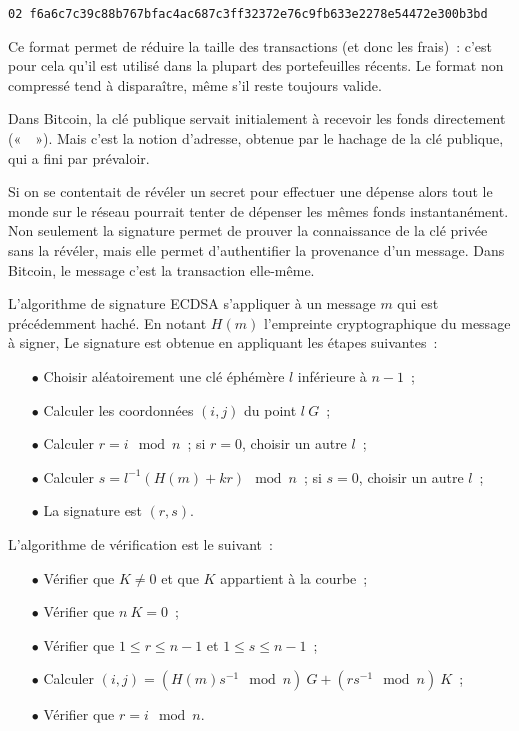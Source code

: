 \begin{Verbatim}[fontsize=\footnotesize]
02 f6a6c7c39c88b767bfac4ac687c3ff32372e76c9fb633e2278e54472e300b3bd
\end{Verbatim}

Ce format permet de réduire la taille des transactions (et donc les frais)~: c'est pour cela qu'il est utilisé dans la plupart des portefeuilles récents. Le format non compressé tend à disparaître, même s'il reste toujours valide.

Dans Bitcoin, la clé publique servait initialement à recevoir les fonds directement («~~»). Mais c'est la notion d'adresse, obtenue par le hachage de la clé publique, qui a fini par prévaloir.


Si on se contentait de révéler un secret pour effectuer une dépense alors tout le monde sur le réseau pourrait tenter de dépenser les mêmes fonds instantanément. Non seulement la signature permet de prouver la connaissance de la clé privée sans la révéler, mais elle permet d'authentifier la provenance d'un message. Dans Bitcoin, le message c'est la transaction elle-même.

L'algorithme de signature ECDSA s'appliquer à un message $m$ qui est précédemment haché. En notant $H(m)$ l'empreinte cryptographique du message à signer, Le signature est obtenue en appliquant les étapes suivantes~: 

\begin{itemize}
  \item[$\bullet$] Choisir aléatoirement une clé éphémère $l$ inférieure à $n-1$~;
  \item[$\bullet$] Calculer les coordonnées $(i,j)$ du point $l~G$~;
  \item[$\bullet$] Calculer $r = i \mod n$~; si $r = 0$, choisir un autre $l$~;
  \item[$\bullet$] Calculer $s = l^{-1} ( H(m) + k r ) \mod n$~; si $s = 0$, choisir un autre $l$~;
  \item[$\bullet$] La signature est $( r, s )$.
\end{itemize}

L'algorithme de vérification est le suivant~:

\begin{itemize}
  \item[$\bullet$] Vérifier que $K \ne 0$ et que $K$ appartient à la courbe~;
  \item[$\bullet$] Vérifier que $n~K = 0$~;
  \item[$\bullet$] Vérifier que $1 \leq r \leq n - 1$ et $1 \leq s \leq n - 1$~;
  \item[$\bullet$] Calculer $(i, j) = ( H(m) s^{-1} \mod n )~G + ( r s^{-1} \mod n  )~K$~;
  \item[$\bullet$] Vérifier que $r = i \mod n$.
\end{itemize}

